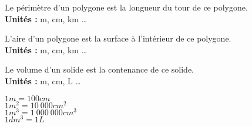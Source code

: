 \begin{minipage}[t]{0.32\textwidth}
    {Le périmètre d'un polygone est la longueur du tour de ce polygone.\\
    \textbf{Unités :} m, cm, km \dots}
\end{minipage}
\hfill
\begin{minipage}[t]{0.32\textwidth}
    {L'aire d'un polygone est la surface à l'intérieur de ce polygone.\\
    \textbf{Unités :} m, cm, km \dots}
\end{minipage}
\hfill
\begin{minipage}[t]{0.32\textwidth}
    {Le volume d'un solide est la contenance de ce solide.\\
    \textbf{Unités :} m, cm, L \dots}
\end{minipage}

{\begin{multicols}{4}
    $1m=100cm$\\
    $1m^2 = 10~000cm^2$\\
    $1m^3 = 1~000~000cm^3$\\
    $1dm^3 = 1L$
\end{multicols}
}